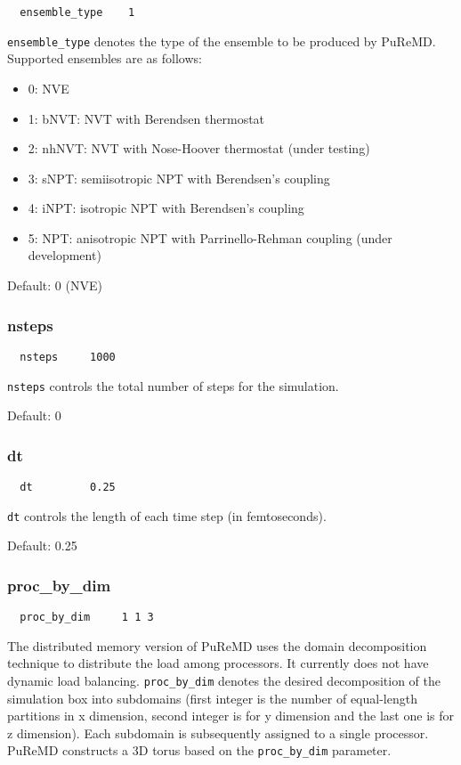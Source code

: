 \documentclass{article}
\begin{document}
\begin{verbatim}
  ensemble_type    1
\end{verbatim}
{\tt ensemble\_type} denotes the type of the ensemble to be produced by 
PuReMD. Supported ensembles are as follows:
\begin{itemize}
  \item 0: NVE
  \item 1: bNVT: NVT with Berendsen thermostat
  \item 2: nhNVT: NVT with Nose-Hoover thermostat (under testing)
  \item 3: sNPT: semiisotropic NPT with Berendsen's coupling
  \item 4: iNPT: isotropic NPT with Berendsen's coupling
  \item 5: NPT: anisotropic NPT with Parrinello-Rehman coupling 
    (under development)
\end{itemize}

Default: 0 (NVE)

\subsubsection{nsteps}
\label{sec:nsteps}

\begin{verbatim}
  nsteps     1000
\end{verbatim}
{\tt nsteps} controls the total number of steps for the simulation.

Default: 0

\subsubsection{dt}
\label{sec:dt}

\begin{verbatim}
  dt         0.25
\end{verbatim}
{\tt dt} controls the length of each time step (in femtoseconds). 

Default: 0.25

\subsubsection{proc\_by\_dim}
\label{sec:proc_by_dim}

\begin{verbatim}
  proc_by_dim     1 1 3
\end{verbatim}
The distributed memory version of PuReMD uses the
domain decomposition technique to distribute the load
among processors. It currently does not have dynamic load balancing.
{\tt proc\_by\_dim} denotes the desired decomposition of the simulation 
box into subdomains (first integer is the number of equal-length 
partitions in x dimension, second integer is for y dimension and 
the last one is for z dimension). Each subdomain is subsequently assigned 
to a single processor. PuReMD constructs a 3D torus based on the 
{\tt proc\_by\_dim} parameter.
\end{document}
